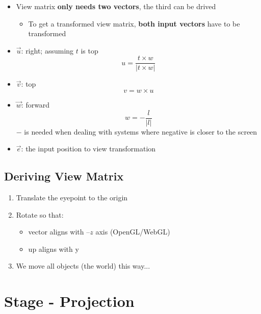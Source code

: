   \begin{itemize}
    \item View matrix \textbf{only needs two vectors}, the third can be drived
    \begin{itemize}
      \item To get a transformed view matrix, \textbf{both input vectors} have
      to be transformed
    \end{itemize}

    \item $ \vec{u} $: right; assuming $ t $ is top
    \begin{equation}
      u = \frac{t \times w}{\left| t \times w \right|}
    \end{equation}

    \item $ \vec{v} $: top
    \begin{equation}
      v = w \times u
    \end{equation}

    \item $ \vec{w} $: forward
    \begin{equation}
      w = - \frac{l}{\left| l \right|}
    \end{equation}
    $ - $ is needed when dealing with systems where negative is closer to the
    screen

    \item $ \vec{e} $: the input position to view transformation
  \end{itemize}

  \subsection{Deriving View Matrix}

    \begin{enumerate}
      \item Translate the eyepoint to the origin
      \item Rotate so that:
      \begin{itemize}
        \item {} vector aligns with $ –z $ axis (OpenGL/WebGL)
        \item up aligns with y
      \end{itemize}

      \item We move all objects (the world) this way...
    \end{enumerate}

\section{Stage - Projection}

